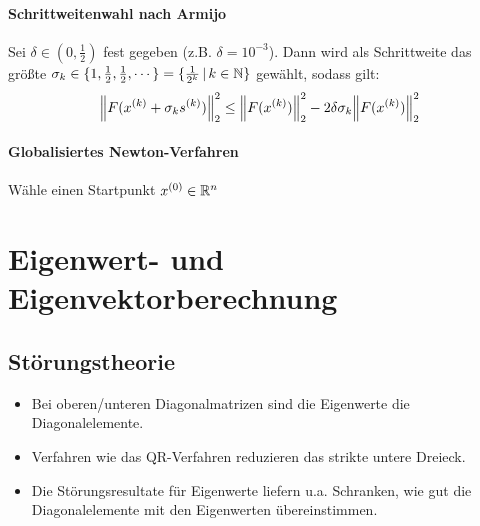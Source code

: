 				\subsubsection{Schrittweitenwahl nach Armijo}
					Sei \( \delta \in (0, \frac{1}{2}) \) fest gegeben (z.B. \( \delta = 10^{-3} \)). Dann wird als Schrittweite das größte \( \sigma_k \in \{ 1, \frac{1}{2}, \frac{1}{2}, \cdots \} = \{ \frac{1}{2^k} \,\vert\, k \in \mathbb{N} \} \) gewählt, sodass gilt:
					\begin{equation*}
						\norm{F(x^{(k)} + \sigma_k s^{(k)})}_2^2 \leq \norm{F(x^{(k)})}_2^2 - 2 \delta \sigma_k \norm{F(x^{(k)})}_2^2
					\end{equation*}

				\subsubsection{Globalisiertes Newton-Verfahren}
					\begin{algorithm}[H]
						\SetAlgoLined
						Wähle einen Startpunkt \( x^{(0)} \in \mathbb{R}^n \) \\
					\end{algorithm}

	\chapter{Eigenwert- und Eigenvektorberechnung}
		\section{Störungstheorie}
			\begin{itemize}
				\item Bei oberen/unteren Diagonalmatrizen sind die Eigenwerte die Diagonalelemente.
				\item Verfahren wie das QR-Verfahren reduzieren das strikte untere Dreieck.
				\item Die Störungsresultate für Eigenwerte liefern u.a. Schranken, wie gut die Diagonalelemente mit den Eigenwerten übereinstimmen.
			\end{itemize}

